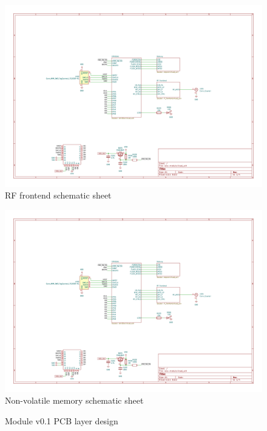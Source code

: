 \begin{figure}
    \includegraphics[page=3,angle=-90,width=\textwidth]{boards/v0.1/lora-module.pdf}
    \caption{\label{schematic:v0.1-3}RF frontend schematic sheet}
\end{figure}
\begin{figure}
    \includegraphics[page=4,angle=-90,width=\textwidth]{boards/v0.1/lora-module.pdf}
    \caption{\label{schematic:v0.1-4}Non-volatile memory schematic sheet}
\end{figure}

\begin{figure}
    \hfill
    \hfill
    \hfill
    \caption{\label{board:v0.1}Module v0.1 PCB layer design}
\end{figure}

